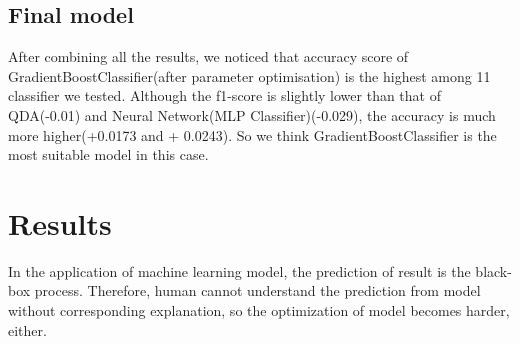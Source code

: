 \documentclass{article}
\begin{document}
\subsection{Final model}
After combining all the results, we noticed that accuracy score of GradientBoostClassifier(after parameter optimisation) is the highest among 11 classifier we tested. Although the f1-score is slightly lower than that of QDA(-0.01) and Neural Network(MLP Classifier)(-0.029), the accuracy is much more higher(+0.0173 and + 0.0243). So we think GradientBoostClassifier is the most suitable model in this case.


\section{Results }

In the application of machine learning model, the prediction of result is the black-box process. Therefore, human cannot understand the prediction from model without corresponding explanation, so the optimization of model becomes harder, either.
\end{document}
